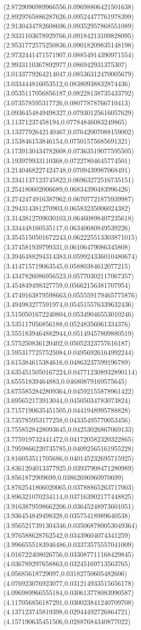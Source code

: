 {(2.8729096989966556,0.09698806421501638)
(2.8929765886287626,0.09524477761978399)
(2.9130434782608696,0.09352957868551089)
(2.9331103678929766,0.09184213109828095)
(2.9531772575250836,0.09018209835148198)
(2.9732441471571907,0.08854914390971554)
(2.9933110367892977,0.086942931375307)
(3.0133779264214047,0.08536312470005679)
(3.033444816053512,0.08380938832874436)
(3.0535117056856187,0.08228138735433792)
(3.073578595317726,0.08077878766710413)
(3.0936454849498327,0.07930125616057629)
(3.11371237458194,0.07784846083249865)
(3.1337792642140467,0.07642007088159002)
(3.153846153846154,0.07501575685691321)
(3.1739130434782608,0.07363519077595505)
(3.193979933110368,0.07227804645774501)
(3.2140468227424748,0.0709439987068491)
(3.2341137123745822,0.06963272516735151)
(3.254180602006689,0.06834390483996426)
(3.2742474916387962,0.06707721875939987)
(3.294314381270903,0.06583235006024382)
(3.3143812709030103,0.06460898407235618)
(3.334448160535117,0.06340680849539226)
(3.3545150501672243,0.062225513303871015)
(3.374581939799331,0.06106479086345808)
(3.3946488294314383,0.059924336010480674)
(3.414715719063545,0.05880384612077215)
(3.4347826086956523,0.05770302117067357)
(3.454849498327759,0.05662156381707954)
(3.4749163879598663,0.055559179465775876)
(3.494983277591974,0.054515576339632436)
(3.5150501672240804,0.05349046553010246)
(3.535117056856188,0.05248356061334376)
(3.5551839464882944,0.05149457809880519)
(3.575250836120402,0.05052323757616187)
(3.5953177257525084,0.04956926164992244)
(3.615384615384616,0.04863237599196789)
(3.6354515050167224,0.047712308932890114)
(3.65551839464883,0.04680879169575645)
(3.6755852842809364,0.04592155878961422)
(3.695652173913044,0.04505034783073824)
(3.7157190635451505,0.0441948995788828)
(3.735785953177258,0.04335495770053456)
(3.7558528428093645,0.04253026867069133)
(3.775919732441472,0.041720582320322865)
(3.7959866220735785,0.04092565161955228)
(3.816053511705686,0.040145232695715925)
(3.8361204013377925,0.03937908471280989)
(3.8561872909699,0.03862696960970699)
(3.8762541806020065,0.03788865263717003)
(3.896321070234114,0.037163902177448825)
(3.9163879598662206,0.03645248973601051)
(3.936454849498328,0.03575418989640538)
(3.9565217391304346,0.035068780053049364)
(3.976588628762542,0.03439604074341259)
(3.9966555183946486,0.03373575557041009)
(4.016722408026756,0.033087711168429845)
(4.036789297658863,0.03245169713563765)
(4.05685618729097,0.03182750605482606)
(4.076923076923077,0.031214933515656178)
(4.096989966555184,0.030613778083990587)
(4.117056856187291,0.030023841240709708)
(4.137123745819398,0.02944492726864721)
(4.157190635451506,0.02887684340877022)
}
